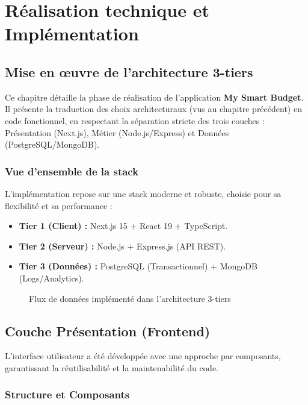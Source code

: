\chapter{Réalisation technique et Implémentation}

\section{Mise en œuvre de l'architecture 3-tiers}

Ce chapitre détaille la phase de réalisation de l'application \textbf{My Smart Budget}. Il présente la traduction des choix architecturaux (vus au chapitre précédent) en code fonctionnel, en respectant la séparation stricte des trois couches : Présentation (Next.js), Métier (Node.js/Express) et Données (PostgreSQL/MongoDB).

\subsection{Vue d'ensemble de la stack}

L'implémentation repose sur une stack moderne et robuste, choisie pour sa flexibilité et sa performance :

\begin{itemize}
    \item \textbf{Tier 1 (Client) :} Next.js 15 + React 19 + TypeScript.
    \item \textbf{Tier 2 (Serveur) :} Node.js + Express.js (API REST).
    \item \textbf{Tier 3 (Données) :} PostgreSQL (Transactionnel) + MongoDB (Logs/Analytics).
\end{itemize}

\begin{figure}[H]
    \centering
    \caption{Flux de données implémenté dans l'architecture 3-tiers}
    \label{fig:arch_impl}
\end{figure}

\section{Couche Présentation (Frontend)}

L'interface utilisateur a été développée avec une approche par composants, garantissant la réutilisabilité et la maintenabilité du code.

\subsection{Structure et Composants}

